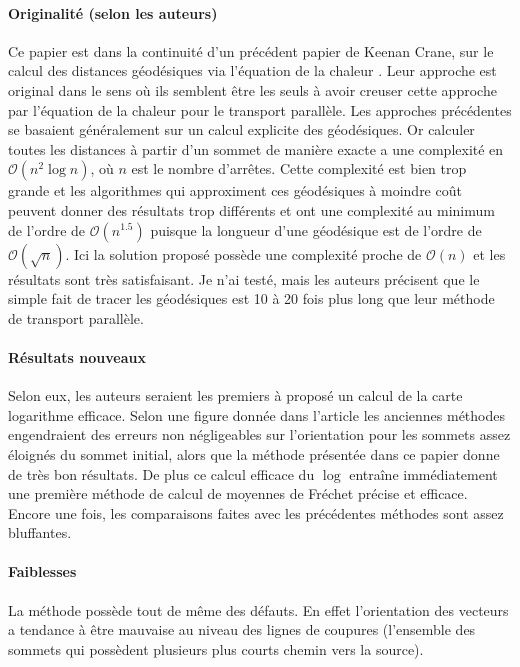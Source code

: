 \documentclass[11pt]{article}
\begin{document}
	\paragraph{Originalité (selon les auteurs)}
	Ce papier est dans la continuité d'un précédent papier de Keenan Crane, sur le calcul des distances géodésiques via l'équation de la chaleur \cite{HM}. Leur approche est original dans le sens où ils semblent être les seuls à avoir creuser cette approche par l'équation de la chaleur pour le transport parallèle. Les approches précédentes se basaient généralement sur un calcul explicite des géodésiques. Or calculer toutes les distances à partir d'un sommet de manière exacte a une complexité en $\mathcal{O}(n^2 \log n)$, où $n$ est le nombre d'arrêtes. Cette complexité est bien trop grande et les algorithmes qui approximent ces géodésiques à moindre coût peuvent donner des résultats trop différents et ont une complexité au minimum de l'ordre de $\mathcal{O}(n^{1.5})$ puisque la longueur d'une géodésique est de l'ordre de $\mathcal{O}(\sqrt{n})$. Ici la solution proposé possède une complexité proche de $\mathcal{O}(n)$ et les résultats sont très satisfaisant. Je n'ai testé, mais les auteurs précisent que le simple fait de tracer les géodésiques est 10 à 20 fois plus long que leur méthode de transport parallèle.
	
	\paragraph{Résultats nouveaux}
	Selon eux, les auteurs seraient les premiers à proposé un calcul de la carte logarithme efficace. Selon une figure donnée dans l'article les anciennes méthodes engendraient des erreurs non négligeables sur l'orientation pour les sommets assez éloignés du sommet initial, alors que la méthode présentée dans ce papier donne de très bon résultats. De plus ce calcul efficace du $\log$ entraîne immédiatement une première méthode de calcul de moyennes de Fréchet précise et efficace. Encore une fois, les comparaisons faites avec les précédentes méthodes sont assez bluffantes.
	
	\paragraph{Faiblesses}
	La méthode possède tout de même des défauts. En effet l'orientation des vecteurs a tendance à être mauvaise au niveau des lignes de coupures (l'ensemble des sommets qui possèdent plusieurs plus courts chemin vers la source).
	
\end{document}
